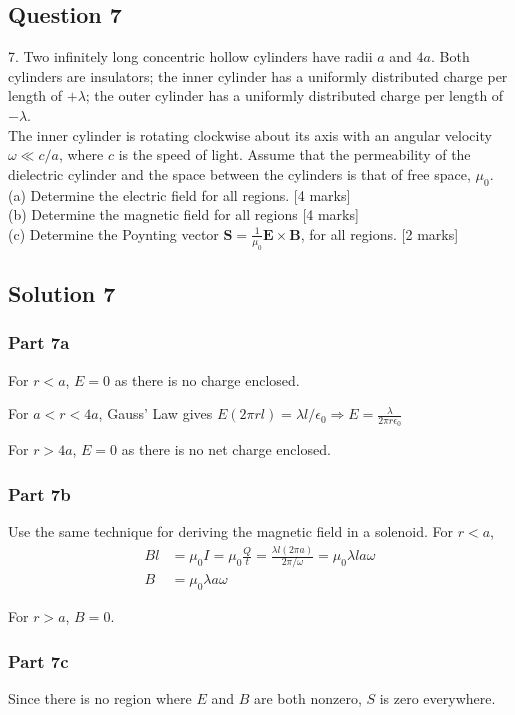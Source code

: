 \documentclass{article}
\begin{document}
\subsection{Question 7}
7. Two infinitely long concentric hollow cylinders have radii $a$ and $4 a$. Both cylinders are insulators; the inner cylinder has a uniformly distributed charge per length of $+\lambda$; the outer cylinder has a uniformly distributed charge per length of $-\lambda$. \\
The inner cylinder is rotating clockwise about its axis with an angular velocity $\omega \ll c / a$, where $c$ is the speed of light. Assume that the permeability of the dielectric cylinder and the space between the cylinders is that of free space, $\mu_{0}$. \\
(a) Determine the electric field for all regions. [4 marks] \\
(b) Determine the magnetic field for all regions [4 marks] \\
(c) Determine the Poynting vector $\mathbf{S}=\frac{1}{\mu_{0}} \mathbf{E} \times \mathbf{B}$, for all regions. [2 marks]

\subsection{Solution 7}
\subsubsection{Part 7a}
For $r<a$, $E=0$ as there is no charge enclosed.

For $a < r < 4a$, Gauss' Law gives $E(2\pi rl)=\lambda l/\epsilon_0 \Rightarrow E=\frac{\lambda}{2\pi r \epsilon_0}$

For $r > 4a$, $E=0$ as there is no net charge enclosed.

\subsubsection{Part 7b}
Use the same technique for deriving the magnetic field in a solenoid. For $r<a$, 
\begin{align}
    Bl &= \mu_0 I = \mu_0 \frac{Q}{t} = \frac{\lambda l(2\pi a)}{2\pi/\omega} = \mu_0 \lambda l a \omega \\
    B &= \mu_0 \lambda a \omega
\end{align}

For $r > a$, $B=0$.

\subsubsection{Part 7c}
Since there is no region where $E$ and $B$ are both nonzero, $S$ is zero everywhere.
\end{document}
